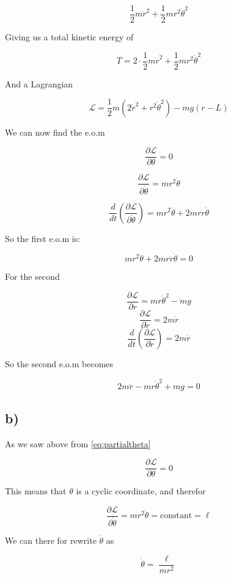 \documentclass[a4paper,norsk, 10pt]{article}
\begin{document}
$$
\frac{1}{2}m\dot{r}^2 + \frac{1}{2}mr^2\dot{\theta}^2
$$

Giving us a total kinetic energy of

$$
T = 2\cdot\frac{1}{2}m\dot{r}^2 + \frac{1}{2}mr^2\dot{\theta}^2 
$$

And a Lagrangian

$$
\mathcal{L} = \frac{1}{2}m(2\dot{r}^2 +r^2\dot{\theta}^2) - mg(r-L)
$$

We can now find the e.o.m

\begin{equation}
\frac{\partial \mathcal{L}}{\partial \theta} = 0
\label{eq:partialtheta}
\end{equation}


\begin{equation}
\frac{\partial \mathcal{L}}{\partial \dot{\theta}} = mr^2\dot{\theta}
\label{eq:partialthetadot}
\end{equation}

$$
\frac{d}{dt}\left(\frac{\partial \mathcal{L}}{\partial \dot{\theta}}\right) = mr^2\ddot{\theta} + 2mr\dot{r}\dot{\theta}
$$

So the first e.o.m is:

$$
mr^2\ddot{\theta} + 2mr\dot{r}\dot{\theta} = 0
$$


For the second

$$
\frac{\partial \mathcal{L}}{\partial r} = mr\dot{\theta}^2 - mg
$$
$$
\frac{\partial \mathcal{L}}{\partial \dot{r}} = 2m\dot{r}
$$
$$
\frac{d}{dt}\left(\frac{\partial \mathcal{L}}{\partial \dot{r}}\right) = 2m\ddot{r}
$$

So the second e.o.m becomes

$$
2m\ddot{r} - mr\dot{\theta}^2 + mg = 0
$$

\subsection*{b)}

As we saw above from \ref{eq:partialtheta}

$$
\frac{\partial \mathcal{L}}{\partial \theta} = 0
$$

This means that $\theta$ is a cyclic coordinate, and therefor


$$
\frac{\partial \mathcal{L}}{\partial \dot{\theta}} = mr^2\dot{\theta} = \mathrm{constant} = \ell
$$

We can there for rewrite $\dot{\theta}$ as 

$$
\dot{\theta} = \frac{\ell}{mr^2}
$$
\end{document}
